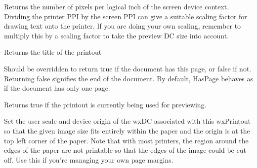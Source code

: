 


\label{wxprintoutgetppiscreen}


Returns the number of pixels per logical inch of the screen device context.
Dividing the printer PPI by the screen PPI can give a suitable scaling factor
for drawing text onto the printer. If you are doing your own scaling, remember
to multiply this by a scaling factor to take the preview DC size into account.


\label{wxprintoutgettitle}


Returns the title of the printout




\label{wxprintouthaspage}


Should be overridden to return true if the document has this page, or false
if not. Returning false signifies the end of the document. By default,
HasPage behaves as if the document has only one page.


\label{wxprintoutispreview}


Returns true if the printout is currently being used for previewing.


\label{wxprintoutfitthissizetopaper}


Set the user scale and device origin of the wxDC associated with this wxPrintout
so that the given image size fits entirely within the paper and the origin is at
the top left corner of the paper. Note that with most printers, the region
around the edges of the paper are not printable so that the edges of the image
could be cut off. Use this if you're managing your own page margins.

